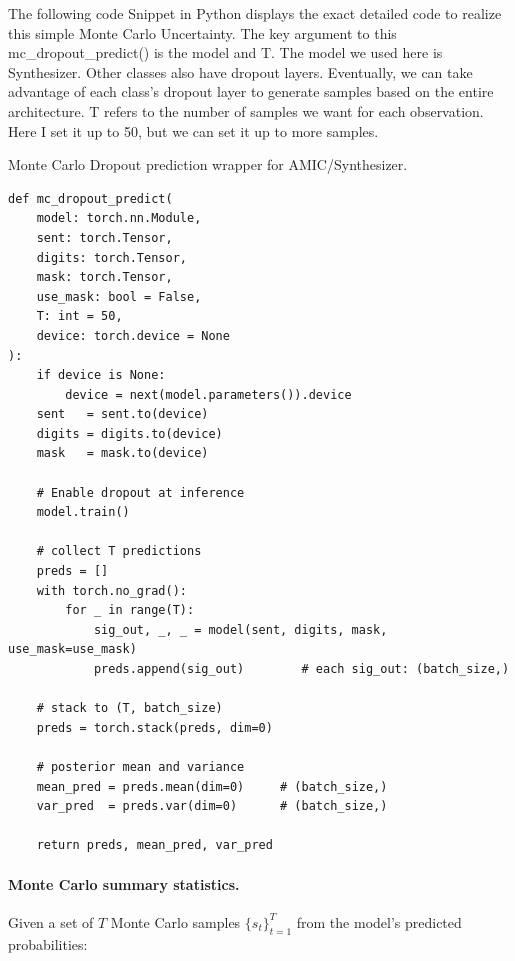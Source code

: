 \documentclass{article}
\begin{document}
The following code Snippet in Python displays the exact detailed code to realize this simple Monte Carlo Uncertainty. The key argument to this mc\_dropout\_predict() is the model and T. The model we used here is Synthesizer. Other classes also have dropout layers. Eventually, we can take advantage of each class's dropout layer to generate samples based on the entire architecture. T refers to the number of samples we want for each observation. Here I set it up to 50, but we can set it up to more samples. 
\begin{listing}[!ht]
\caption{Monte Carlo Dropout prediction wrapper for AMIC/Synthesizer.}
\label{lst:mc-dropout}
\begin{verbatim}
def mc_dropout_predict(
    model: torch.nn.Module,
    sent: torch.Tensor,
    digits: torch.Tensor,
    mask: torch.Tensor,
    use_mask: bool = False,
    T: int = 50,
    device: torch.device = None
):
    if device is None:
        device = next(model.parameters()).device
    sent   = sent.to(device)
    digits = digits.to(device)
    mask   = mask.to(device)

    # Enable dropout at inference
    model.train()

    # collect T predictions
    preds = []
    with torch.no_grad():
        for _ in range(T):
            sig_out, _, _ = model(sent, digits, mask, use_mask=use_mask)
            preds.append(sig_out)        # each sig_out: (batch_size,)

    # stack to (T, batch_size)
    preds = torch.stack(preds, dim=0)

    # posterior mean and variance
    mean_pred = preds.mean(dim=0)     # (batch_size,)
    var_pred  = preds.var(dim=0)      # (batch_size,)

    return preds, mean_pred, var_pred
\end{verbatim}
\end{listing}

\paragraph{Monte Carlo summary statistics.}
Given a set of $T$ Monte Carlo samples $\{ s_t \}_{t=1}^T$ from the model’s predicted probabilities:
\end{document}
